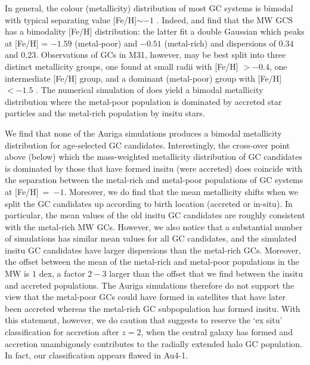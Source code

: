 \documentclass[a4paper,fleqn,usenatbib]{mnras}
\begin{document}
In general, the colour (metallicity) distribution of most GC systems is bimodal 
with typical separating value [Fe/H]$\sim -1$ \citep{1985ApJ...293..424Z,
1999AJ....118.1526G,2001AJ....121.2974L,2006ApJ...639...95P}. Indeed, 
\citet[][p. 234]{1998gcs..book.....A} and \citet[][p. 38]{Harris2001} find that
the MW GCS has a bimodality [Fe/H] distribution: the latter fit a double Gaussian 
which peaks at [Fe/H] = $-1.59$ (metal-poor) and $-0.51$ (metal-rich) and 
dispersions of $0.34$ and $0.23$. Observations of GCs in M31, however, may be
best split into three distinct metallicity groups, one found at small radii with 
[Fe/H] $>-0.4$, one intermediate [Fe/H] group, and a dominant (metal-poor) group 
with [Fe/H] $< -1.5$ \citep{2016ApJ...824...42C}. The numerical simulation of
\citet{2017MNRAS.465.3622R} does yield a bimodal metallicity distribution where
the metal-poor population is dominated by accreted star particles and the metal-rich
population by insitu stars. 

We find that none of the Auriga simulations produces a bimodal 
metallicity distribution for age-selected GC candidates. Interestingly, the 
cross-over point above (below) which the mass-weighted metallicity distribution
of GC candidates is dominated by those that have formed insitu (were accreted) 
does coincide with the separation between the metal-rich and metal-poor populations 
of GC systems at [Fe/H]~=~$-1$. Moreover, we do find that the mean metallicity
shifts when we split the GC candidates up according to birth location (accreted
or in-situ). In particular, the mean values of the old insitu GC candidates are 
roughly consistent with the metal-rich MW GCs. However, we also notice that a 
substantial number of simulations has similar mean values for all GC candidates, 
and the simulated insitu GC candidates have larger dispersions than the metal-rich 
GCs. Moreover, the offset between the mean of the metal-rich and metal-poor 
populations in the MW is $1$ dex, a factor $2-3$ larger than the offset that we 
find between the insitu and accreted populations. The Auriga simulations therefore
do not support the view that the metal-poor GCs could have formed in satellites
that have later been accreted whereas the metal-rich GC subpopulation has formed
insitu. With this statement, however, we do caution that \citet{2019MNRAS.486.3134K} 
suggests to reserve the `ex situ' classification for accretion after $z=2$, when
the central galaxy has formed and accretion unambigously contributes to the
radially extended halo GC population. In fact, our classification appears flawed
in Au4-1.
\end{document}
